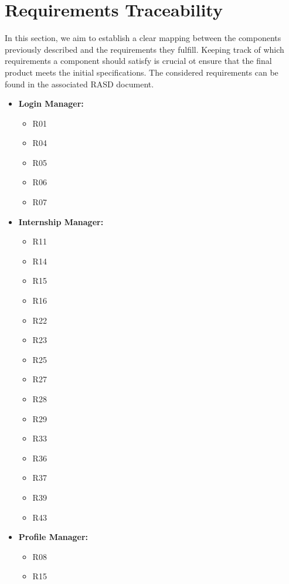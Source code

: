 \chapter{Requirements Traceability}
\label{ch:requirements-traceability}
\par In this section, we aim to establish a clear mapping between the components previously described and the requirements they fulfill.
Keeping track of which requirements a component should satisfy is crucial ot ensure that the final product meets the initial specifications.
The considered requirements can be found in the associated RASD document.
\begin{itemize}
    \item \textbf{Login Manager:}
          \begin{itemize}
              \item R01
              \item R04
              \item R05
              \item R06
              \item R07
          \end{itemize}
    \item \textbf{Internship Manager:}
          \begin{itemize}
              \item R11
              \item R14
              \item R15
              \item R16
              \item R22
              \item R23
              \item R25
              \item R27
              \item R28
              \item R29
              \item R33
              \item R36
              \item R37
              \item R39
              \item R43
          \end{itemize}
    \item \textbf{Profile Manager:}
          \begin{itemize}
              \item R08
              \item R15

\end{itemize}
\end{itemize}
